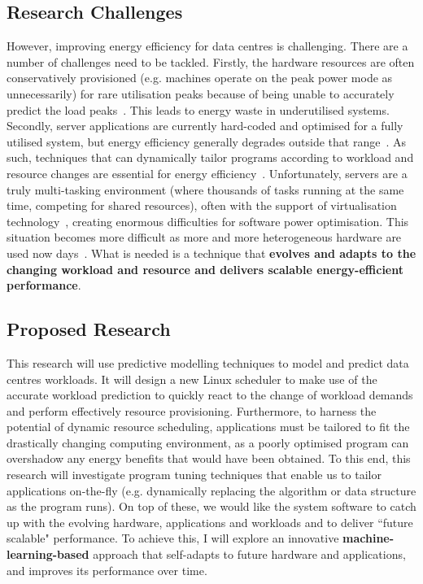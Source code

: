 \subsection{Research Challenges}
However, improving energy efficiency for data centres is challenging. There are a number of challenges need to be tackled. Firstly, the hardware resources are often conservatively provisioned (e.g. machines operate on the peak power mode as unnecessarily)  for rare utilisation peaks because of being unable to accurately predict the load peaks~\cite{energy-aware,towardsenergyeff}. This leads to energy waste in underutilised systems. Secondly, server applications are currently hard-coded and optimised for a fully utilised system, but energy efficiency generally degrades outside that range~\cite{towardsenergyeff,autodatacentre}. As such, techniques that can dynamically tailor programs according to workload and resource changes are essential for energy efficiency~\cite{towardsenergyeff}. Unfortunately, servers are a truly multi-tasking environment (where thousands of tasks running at the same time, competing for shared resources), often with the support of virtualisation technology~\cite{energy-effcloud}, creating enormous difficulties for software power optimisation. This situation becomes more difficult as more and more heterogeneous hardware are used now days~\cite{aview}. What is needed is a technique that \textbf{evolves and adapts to the changing workload and resource and delivers scalable energy-efficient performance}.

\subsection{Proposed Research}
This research will use predictive modelling techniques to model and predict data centres workloads. It will design a new Linux scheduler to make use of the accurate workload prediction to quickly react to the change of workload demands and perform effectively resource provisioning.  Furthermore, to harness the potential of dynamic resource scheduling, applications must be tailored to fit the drastically changing computing environment, as a poorly optimised program can overshadow any energy benefits that would have been obtained. To this end, this research will investigate program tuning techniques that enable us to tailor applications on-the-fly (e.g. dynamically replacing the algorithm or data structure as the program runs). On top of these, we would like the system software to catch up with the evolving hardware, applications and workloads and to deliver ``future scalable" performance. To achieve this, I will explore an innovative \textbf{machine-learning-based} approach that self-adapts to future hardware and applications, and improves its performance over time.

